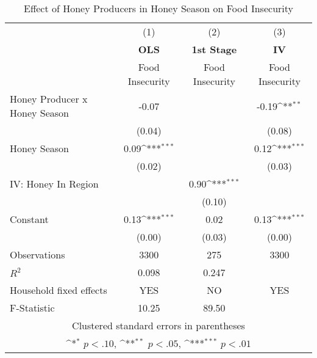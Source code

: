 \begin{table}[htbp]\centering \small
\def\sym#1{\ifmmode^{#1}\else\(^{#1}\)\fi}
\caption{Effect of Honey Producers in Honey Season on Food Insecurity \label{IV}}
\begin{tabular}{l*{3}{c}}
\toprule
                &\multicolumn{1}{c}{(1)}&\multicolumn{1}{c}{(2)}&\multicolumn{1}{c}{(3)}\\
                &\multicolumn{1}{c}{  \textbf{OLS}  }&\multicolumn{1}{c}{\textbf{1st Stage}}&\multicolumn{1}{c}{ \textbf{IV}}\\
                &Food Insecurity         &Food Insecurity         &Food Insecurity         \\
\midrule
Honey Producer x Honey Season&    -0.07         &                  &    -0.19\sym{**} \\
                &   (0.04)         &                  &   (0.08)         \\
Honey Season    &     0.09\sym{***}&                  &     0.12\sym{***}\\
                &   (0.02)         &                  &   (0.03)         \\
IV: Honey In Region&                  &     0.90\sym{***}&                  \\
                &                  &   (0.10)         &                  \\
Constant        &     0.13\sym{***}&     0.02         &     0.13\sym{***}\\
                &   (0.00)         &   (0.03)         &   (0.00)         \\
\midrule
Observations    &     3300         &      275         &     3300         \\
\(R^{2}\)       &    0.098         &    0.247         &                  \\
Household fixed effects&      YES         &       NO         &      YES         \\
F-Statistic     &    10.25         &    89.50         &                  \\
\bottomrule
\multicolumn{4}{c}{\footnotesize Clustered standard errors in parentheses}\\
\multicolumn{4}{c}{\footnotesize \sym{*} \(p<.10\), \sym{**} \(p<.05\), \sym{***} \(p<.01\)}\\
\end{tabular}
\end{table}
